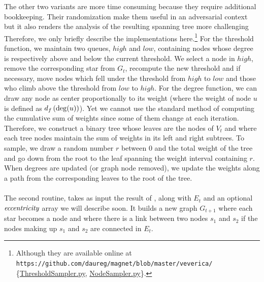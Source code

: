 The other two variants are more time consuming because they require additional bookkeeping. Their
randomization make them useful in an adversarial context but it also renders the analysis  of the
resulting spanning tree more challenging
Therefore, we only briefly describe the implementations here.\footnote{Although they are available
online at 
\nolinkurl{https://github.com/daureg/magnet/blob/master/veverica/}%
\{\href{https://github.com/daureg/magnet/blob/master/veverica/ThresholdSampler.py}%
{ThresholdSampler.py}, \href{https://github.com/daureg/magnet/blob/master/veverica/NodeSampler.py}%
{NodeSampler.py}\}.} For the threshold function, we
maintain two queues, $high$ and $low$, containing nodes whose degree is respectively above and below
the current threshold. We select a node \uar{} in $high$, remove the corresponding star from $G_t$,
recompute the new threshold and if necessary, move nodes which fell under the threshold from $high$
to $low$ and those who climb above the threshold from $low$ to $high$. For the degree function, we
can draw any node as center proportionally to its weight (where the weight of node $u$ is defined as
$d_f\left(\operatorname{deg}(u)\right)$). Yet we cannot use the standard method of computing the cumulative sum
of weights since some of them change at each iteration. Therefore, we construct a binary tree whose
leaves are the nodes of $V_t$ and where each tree nodes maintain the sum of weights in its left and
right subtrees. To sample, we draw a random number $r$ between $0$ and the total weight of the tree and
go down from the root to the leaf spanning the weight interval containing $r$.
When degrees are updated (or graph node removed), we update the weights along a path from the
corresponding leaves to the root of the tree.

\medskip

\paragraph{\collapseStar{}}\label{par:collapsestar}%
The second routine, \collapseStar{} takes as input the result of \extractStar{}, along with $E_t$
and an optional $\emph{eccentricity}$ array we will describe soon. It builds a new graph $G_{t+1}$
where each star becomes a node and where there is a link between two nodes $s_1$ and $s_2$ if the nodes
making up $s_1$ and $s_2$ are connected in $E_t$.

